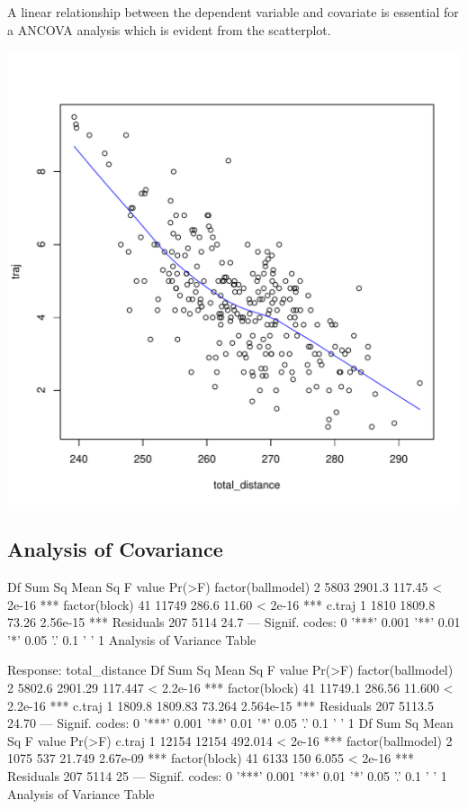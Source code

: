 \documentclass{article}\usepackage[]{graphicx}\usepackage[]{color}
\makeatletter
\def\maxwidth{ %
  \ifdim\Gin@nat@width>\linewidth
    \linewidth
  \else
    \Gin@nat@width
  \fi
}
\makeatother
\begin{document}
\bigskip

A linear relationship between the dependent variable and covariate is essential for a ANCOVA analysis which is evident from the scatterplot.

\includegraphics[width=\maxwidth]{figure/linearity_of_variables-1} 



\subsection*{Analysis of Covariance}

                   Df Sum Sq Mean Sq F value   Pr(>F)    
factor(ballmodel)   2   5803  2901.3  117.45  < 2e-16 ***
factor(block)      41  11749   286.6   11.60  < 2e-16 ***
c.traj              1   1810  1809.8   73.26 2.56e-15 ***
Residuals         207   5114    24.7                     
---
Signif. codes:  0 '***' 0.001 '**' 0.01 '*' 0.05 '.' 0.1 ' ' 1
Analysis of Variance Table

Response: total_distance
                   Df  Sum Sq Mean Sq F value    Pr(>F)    
factor(ballmodel)   2  5802.6 2901.29 117.447 < 2.2e-16 ***
factor(block)      41 11749.1  286.56  11.600 < 2.2e-16 ***
c.traj              1  1809.8 1809.83  73.264 2.564e-15 ***
Residuals         207  5113.5   24.70                      
---
Signif. codes:  0 '***' 0.001 '**' 0.01 '*' 0.05 '.' 0.1 ' ' 1
                   Df Sum Sq Mean Sq F value   Pr(>F)    
c.traj              1  12154   12154 492.014  < 2e-16 ***
factor(ballmodel)   2   1075     537  21.749 2.67e-09 ***
factor(block)      41   6133     150   6.055  < 2e-16 ***
Residuals         207   5114      25                     
---
Signif. codes:  0 '***' 0.001 '**' 0.01 '*' 0.05 '.' 0.1 ' ' 1
Analysis of Variance Table
\end{document}
